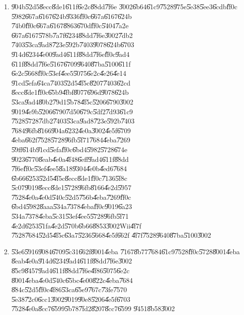 \documentclass[12pt,a4paper]{article}
\begin{document}
\begin{enumerate}
\item \U{904b}\U{52d5}\U{8ecc}\U{8de1}\U{611f}\U{6e2c}\U{88dd}\U{7f6e}%
\U{3002}\U{6b64}\U{61c9}\U{7528}\U{975e}\U{5e38}\U{5ee3}\U{6cdb}\U{ff0c}%
\U{5982}\U{667a}\U{6167}\U{624b}\U{9336}\U{ff0c}\U{667a}\U{6167}\U{624b}%
\U{74b0}\U{ff0c}\U{667a}\U{6167}\U{8863}\U{670d}\U{ff0c}\U{5404}\U{7a2e}%
\U{667a}\U{6167}\U{578b}\U{7a7f}\U{6234}\U{88dd}\U{7f6e}\U{3002}\U{7db2}%
\U{7403}\U{53ca}\U{9ad8}\U{723e}\U{592b}\U{7403}\U{9078}\U{624b}\U{6703}%
\U{914d}\U{6234}\U{4e00}\U{9ad4}\U{611f}\U{88dd}\U{7f6e}\U{ff0c}\U{9ad4}%
\U{611f}\U{88dd}\U{7f6e}\U{5167}\U{6709}\U{9640}\U{87ba}\U{5100}\U{611f}%
\U{6e2c}\U{5668}\U{ff0c}\U{53ef}\U{4ee5}\U{5075}\U{6e2c}\U{4e26}\U{4e14}%
\U{91cd}\U{5efa}\U{64ca}\U{7403}\U{52d5}\U{4f5c}\U{8207}\U{7403}\U{62cd}%
\U{8ecc}\U{8de1}\U{ff0c}\U{65b9}\U{4fbf}\U{8077}\U{696d}\U{9078}\U{624b}%
\U{53ca}\U{9ad4}\U{80b2}\U{79d1}\U{5b78}\U{4f5c}\U{5206}\U{6790}\U{3002}%
\U{9019}\U{4e9b}\U{5206}\U{6790}\U{7d50}\U{679c}\U{5df2}\U{7d93}\U{61c9}%
\U{7528}\U{5728}\U{7db2}\U{7403}\U{53ca}\U{9ad8}\U{723e}\U{592b}\U{7403}%
\U{7684}\U{96fb}\U{8166}\U{904a}\U{6232}\U{4e0a}\U{3002}\U{4e5f}\U{6709}%
\U{4eba}\U{662f}\U{7528}\U{5728}\U{96fb}\U{5f71}\U{7684}\U{4eba}\U{7269}%
\U{59ff}\U{614b}\U{91cd}\U{5efa}\U{ff0c}\U{6bd4}\U{5982}\U{5728}\U{674e}%
\U{9023}\U{6770}\U{8eab}\U{4e0a}\U{4f48}\U{6eff}\U{9ad4}\U{611f}\U{88dd}%
\U{7f6e}\U{ff0c}\U{53ef}\U{4ee5}\U{8a18}\U{9304}\U{4e0b}\U{4ed6}\U{7684}%
\U{6b66}\U{6253}\U{52d5}\U{4f5c}\U{8ecc}\U{8de1}\U{ff0c}\U{7136}\U{5f8c}%
\U{5c07}\U{9019}\U{8ecc}\U{8de1}\U{5728}\U{96fb}\U{8166}\U{4e2d}\U{5957}%
\U{7528}\U{4e0a}\U{4e0d}\U{540c}\U{52d5}\U{756b}\U{4eba}\U{7269}\U{ff0c}%
\U{6bd4}\U{5982}\U{8aaa}\U{534a}\U{7378}\U{4eba}\U{ff0c}\U{9019}\U{6a23}%
\U{534a}\U{7378}\U{4eba}\U{5c31}\U{53ef}\U{4ee5}\U{5728}\U{96fb}\U{5f71}%
\U{4e2d}\U{6253}\U{51fa}\U{4e2d}\U{570b}\U{6b66}\U{8853}\U{3002}Wii\U{4f7f}%
\U{7528}\U{7684}\U{52d5}\U{4f5c}\U{63a7}\U{5236}\U{5668}\U{4e5f}\U{662f}%
\U{4f7f}\U{7528}\U{9640}\U{87ba}\U{5100}\U{3002}

\item \U{53e6}\U{5916}\U{9084}\U{6709}\U{5c31}\U{662f}\U{8001}\U{4eba}%
\U{7167}\U{8b77}\U{7684}\U{61c9}\U{7528}\U{ff0c}\U{5728}\U{8001}\U{4eba}%
\U{8eab}\U{4e0a}\U{914d}\U{6234}\U{9ad4}\U{611f}\U{88dd}\U{7f6e}\U{3002}%
\U{85c9}\U{8457}\U{9ad4}\U{611f}\U{88dd}\U{7f6e}\U{4f86}\U{5075}\U{6e2c}%
\U{8001}\U{4eba}\U{4e0d}\U{540c}\U{65bc}\U{4e00}\U{822c}\U{4eba}\U{7684}%
\U{884c}\U{52d5}\U{ff0c}\U{4f86}\U{53ca}\U{65e9}\U{767c}\U{73fe}\U{7570}%
\U{5e38}\U{72c0}\U{6cc1}\U{3002}\U{9019}\U{90e8}\U{5206}\U{4e5f}\U{6703}%
\U{7528}\U{4e0a}\U{8cc7}\U{6599}\U{5b78}\U{7fd2}\U{8207}\U{8cc7}\U{6599}%
\U{9451}\U{8b58}\U{3002}


\end{enumerate}
\end{document}
